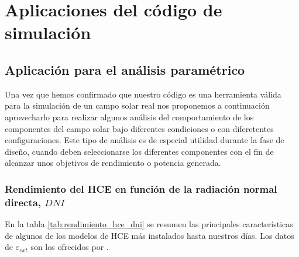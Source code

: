\chapter{Aplicaciones del código de simulación}
\label{aplicaciones}

\section{Aplicación para el análisis paramétrico}
\label{analisis-parametrico}

Una vez que hemos confirmado que nuestro código es una herramienta válida para la simulación de un campo solar real nos proponemos a continuación aprovecharlo para realizar algunos análisis del comportamiento de los componentes del campo solar bajo diferentes condiciones o con diferetentes configuraciones. Este tipo de análisis es de especial utilidad durante la fase de diseño, cuando deben seleccionarse los diferentes componentes con el fin de alcanzar unos objetivos de rendimiento o potencia generada.

\subsection{Rendimiento del HCE en función de la radiación normal directa, $DNI$}

En la tabla \ref{tab:rendimiento_hce_dni} se resumen las principales características de algunos de los modelos de HCE más instalados hasta nuestros días. Los datos de $\varepsilon_{ext}$ son los ofrecidos por \cite{barberofresnoDesarrolloModeloTeorico2018}.

